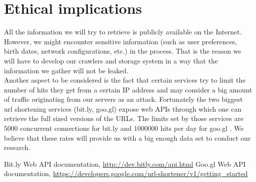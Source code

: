\documentclass{article}
\begin{document}
\section{Ethical implications}
All the information we will try to retrieve is publicly available on the Internet. However, we might encounter sensitive information (such as user preferences, birth dates, network configurations, etc.) in the process. That is the reason we will have to develop our crawlers and storage system in a way that the information we gather will not be leaked.\\
Another aspect to be considered is the fact that certain services try to limit the number of hits they get from a certain IP address and may consider a big amount of traffic originating from our servers as an attack. Fortunately the two biggest url shortening services (bit.ly, goo.gl) expose web APIs through which one can retrieve the full sized versions of the URLs. The limits set by those services are 5000 concurrent \cite{bitlyapi} connections for bit.ly and 1000000 hits per day for goo.gl \cite{googleapi}. We believe that these rates will provide us with a big enough data set to conduct our research. 

\begin{thebibliography}{9}

Bit.ly Web API documentation, \url{http://dev.bitly.com/api.html}
Goo.gl Web API documentation, \url{https://developers.google.com/url-shortener/v1/getting_started}

\end{thebibliography}
\end{document}
